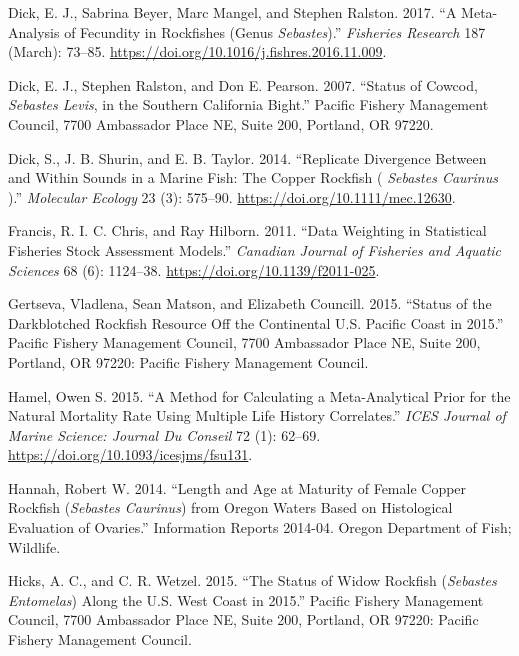 \documentclass[11pt,
  english,
  a4paper,
]{article}
\begin{document}
\begin{cslreferences}
\leavevmode\hypertarget{ref-dick_meta-analysis_2017}{}%
Dick, E. J., Sabrina Beyer, Marc Mangel, and Stephen Ralston. 2017. ``A Meta-Analysis of Fecundity in Rockfishes (Genus \emph{Sebastes}).'' \emph{Fisheries Research} 187 (March): 73--85. \url{https://doi.org/10.1016/j.fishres.2016.11.009}.

\leavevmode\hypertarget{ref-dick_status_2007}{}%
Dick, E. J., Stephen Ralston, and Don E. Pearson. 2007. ``Status of Cowcod, \emph{Sebastes Levis}, in the Southern California Bight.'' Pacific Fishery Management Council, 7700 Ambassador Place NE, Suite 200, Portland, OR 97220.

\leavevmode\hypertarget{ref-dick_replicate_2014}{}%
Dick, S., J. B. Shurin, and E. B. Taylor. 2014. ``Replicate Divergence Between and Within Sounds in a Marine Fish: The Copper Rockfish ( \emph{Sebastes Caurinus} ).'' \emph{Molecular Ecology} 23 (3): 575--90. \url{https://doi.org/10.1111/mec.12630}.

\leavevmode\hypertarget{ref-francis_data_2011}{}%
Francis, R. I. C. Chris, and Ray Hilborn. 2011. ``Data Weighting in Statistical Fisheries Stock Assessment Models.'' \emph{Canadian Journal of Fisheries and Aquatic Sciences} 68 (6): 1124--38. \url{https://doi.org/10.1139/f2011-025}.

\leavevmode\hypertarget{ref-gertseva_status_2015}{}%
Gertseva, Vladlena, Sean Matson, and Elizabeth Councill. 2015. ``Status of the Darkblotched Rockfish Resource Off the Continental U.S. Pacific Coast in 2015.'' Pacific Fishery Management Council, 7700 Ambassador Place NE, Suite 200, Portland, OR 97220: Pacific Fishery Management Council.

\leavevmode\hypertarget{ref-hamel_method_2015}{}%
Hamel, Owen S. 2015. ``A Method for Calculating a Meta-Analytical Prior for the Natural Mortality Rate Using Multiple Life History Correlates.'' \emph{ICES Journal of Marine Science: Journal Du Conseil} 72 (1): 62--69. \url{https://doi.org/10.1093/icesjms/fsu131}.

\leavevmode\hypertarget{ref-hannah_length_2014}{}%
Hannah, Robert W. 2014. ``Length and Age at Maturity of Female Copper Rockfish (\emph{Sebastes Caurinus}) from Oregon Waters Based on Histological Evaluation of Ovaries.'' Information Reports 2014-04. Oregon Department of Fish; Wildlife.

\leavevmode\hypertarget{ref-hicks_status_2015}{}%
Hicks, A. C., and C. R. Wetzel. 2015. ``The Status of Widow Rockfish (\emph{Sebastes Entomelas}) Along the U.S. West Coast in 2015.'' Pacific Fishery Management Council, 7700 Ambassador Place NE, Suite 200, Portland, OR 97220: Pacific Fishery Management Council.


\end{cslreferences}
\end{document}
